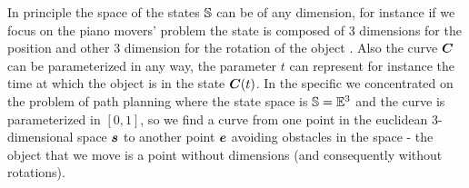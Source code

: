 \documentclass[dissertation.tex]{subfiles}
\begin{document}
In principle the space of the states $\mathbb{S}$ can be of any dimension,
for instance if we focus on the piano movers' problem the state is
composed of 3 dimensions for the position and other 3 dimension for
the rotation of the object \cite{lavalle}. Also
the curve $\boldsymbol{C}$ can be parameterized in any way, the parameter
$t$ can represent for instance the time at which the object is in the
state $\boldsymbol{C}(t)$. In the specific we concentrated on the problem of
path planning where the state space is $\mathbb{S}=\mathbb{E}^3$ and the curve is
parameterized in $[0,1]$, so we find a curve from one point in the
euclidean 3-dimensional space $\boldsymbol{s}$ to another point $\boldsymbol{e}$
avoiding obstacles in the space - the object that we move is a point
without dimensions (and consequently without rotations).
\end{document}
